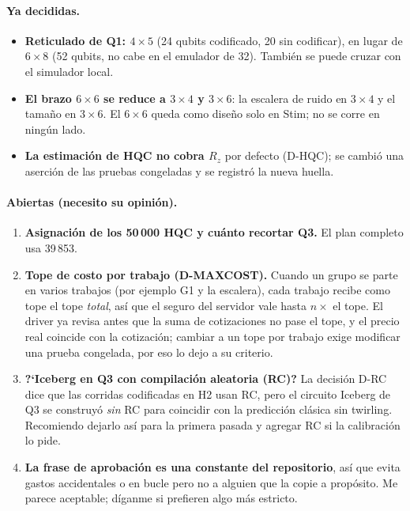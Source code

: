 \documentclass[11pt,a4paper]{article}
\begin{document}
\paragraph{Ya decididas.}
\begin{itemize}[leftmargin=1.4em]
  \item \textbf{Reticulado de Q1: $4{\times}5$} (24 qubits codificado, 20 sin codificar), en lugar de $6{\times}8$
    (52 qubits, no cabe en el emulador de 32). Tambi\'en se puede cruzar con el simulador local.
  \item \textbf{El brazo $6{\times}6$ se reduce a $3{\times}4$ y $3{\times}6$}: la escalera de ruido en $3{\times}4$ y
    el tama\~no en $3{\times}6$. El $6{\times}6$ queda como dise\~no solo en Stim; no se corre en ning\'un lado.
  \item \textbf{La estimaci\'on de HQC no cobra $R_z$} por defecto (D-HQC); se cambi\'o una aserci\'on de las pruebas
    congeladas y se registr\'o la nueva huella.
\end{itemize}

\paragraph{Abiertas (necesito su opini\'on).}
\begin{enumerate}[leftmargin=1.6em]
  \item \textbf{Asignaci\'on de los 50\,000 HQC y cu\'anto recortar Q3.} El plan completo usa 39\,853.
  \item \textbf{Tope de costo por trabajo (D-MAXCOST).} Cuando un grupo se parte en varios trabajos (por
    ejemplo G1 y la escalera), cada trabajo recibe como tope el tope \emph{total}, as\'i que el seguro del
    servidor vale hasta $n\times$ el tope. El driver ya revisa antes que la suma de cotizaciones no pase el
    tope, y el precio real coincide con la cotizaci\'on; cambiar a un tope por trabajo exige modificar una prueba
    congelada, por eso lo dejo a su criterio.
  \item \textbf{?`Iceberg en Q3 con compilaci\'on aleatoria (RC)?} La decisi\'on D-RC dice que las corridas
    codificadas en H2 usan RC, pero el circuito Iceberg de Q3 se construy\'o \emph{sin} RC para coincidir con
    la predicci\'on cl\'asica sin twirling. Recomiendo dejarlo as\'i para la primera pasada y agregar RC si la
    calibraci\'on lo pide.
  \item \textbf{La frase de aprobaci\'on es una constante del repositorio}, as\'i que evita gastos accidentales o
    en bucle pero no a alguien que la copie a prop\'osito. Me parece aceptable; d\'iganme si prefieren algo m\'as
    estricto.
\end{enumerate}
\end{document}
